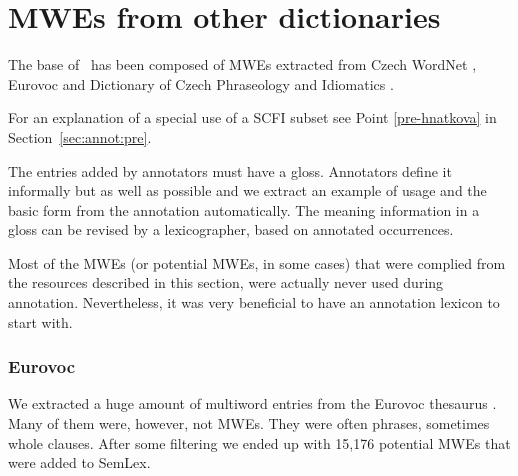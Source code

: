 \section{MWEs from other dictionaries}
\label{sec:semlex:dicts}
The base of \semlex\ has been composed of MWEs extracted from Czech WordNet \citep{smrz:03}, Eurovoc \citep{eurovoc:07} and Dictionary of Czech Phraseology and Idiomatics \citep[SCFI, ][]{cermak:1988}.%

For an explanation of a special use of a SCFI subset see Point \ref{pre-hnatkova} in Section~\ref{sec:annot:pre}. 



The entries added by annotators must have a gloss. Annotators define it informally but as well as possible and we extract an example of usage and the basic form from the annotation automatically. The meaning information in a gloss can be revised by a lexicographer, based on annotated occurrences.

Most of the MWEs (or potential MWEs, in some cases) that were complied from the resources described in this section, were actually never used during annotation. Nevertheless, it was very beneficial to have an annotation lexicon to start with.


\subsubsection{Eurovoc}
\label{sec:semlex:eurovoc}
We extracted a huge amount of multiword entries from the Eurovoc thesaurus \citep{eurovoc:07}. Many of them were, however, not MWEs. They were often phrases, sometimes whole clauses. After some filtering we ended up with 15,176 potential MWEs that were added to SemLex.

